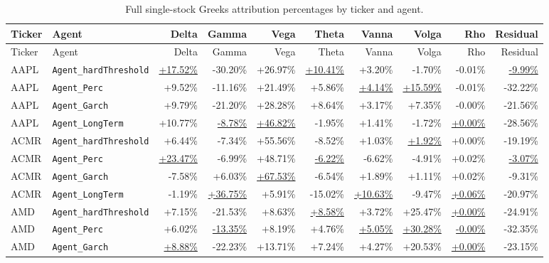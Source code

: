 ﻿\documentclass{article}
\begin{document}
\begingroup
\scriptsize
\setlength{\tabcolsep}{4pt}
\begin{longtable}{llrrrrrrrr}
\caption{Full single-stock Greeks attribution percentages by ticker and agent.}\label{tab:stock-greeks-full} \\
\toprule
Ticker & Agent & Delta & Gamma & Vega & Theta & Vanna & Volga & Rho & Residual \\
\midrule
\endfirsthead

\toprule
Ticker & Agent & Delta & Gamma & Vega & Theta & Vanna & Volga & Rho & Residual \\
\midrule
\endhead

AAPL & \texttt{Agent\_hardThreshold} & \underline{+17.52\%} & -30.20\% & +26.97\% & \underline{+10.41\%} & +3.20\% & -1.70\% & -0.01\% & \underline{-9.99\%} \\
AAPL & \texttt{Agent\_Perc}          & +9.52\%  & -11.16\% & +21.49\% & +5.86\%  & \underline{+4.14\%} & \underline{+15.59\%} & -0.01\% & -32.22\% \\
AAPL & \texttt{Agent\_Garch}         & +9.79\%  & -21.20\% & +28.28\% & +8.64\%  & +3.17\% & +7.35\%  & -0.00\% & -21.56\% \\
AAPL & \texttt{Agent\_LongTerm}      & +10.77\% & \underline{-8.78\%}  & \underline{+46.82\%} & -1.95\%  & +1.41\% & -1.72\%  & \underline{+0.00\%} & -28.56\% \\
\midrule
ACMR & \texttt{Agent\_hardThreshold} & +6.44\%  & -7.34\%  & +55.56\% & -8.52\%  & +1.03\% & \underline{+1.92\%}  & +0.00\% & -19.19\% \\
ACMR & \texttt{Agent\_Perc}          & \underline{+23.47\%} & -6.99\%  & +48.71\% & \underline{-6.22\%}  & -6.62\% & -4.91\%  & +0.02\% & \underline{-3.07\%} \\
ACMR & \texttt{Agent\_Garch}         & -7.58\%  & +6.03\%  & \underline{+67.53\%} & -6.54\%  & +1.89\% & +1.11\%  & +0.02\% & -9.31\% \\
ACMR & \texttt{Agent\_LongTerm}      & -1.19\%  & \underline{+36.75\%} & +5.91\%  & -15.02\% & \underline{+10.63\%} & -9.47\% & \underline{+0.06\%} & -20.97\% \\
\midrule
AMD  & \texttt{Agent\_hardThreshold} & +7.15\%  & -21.53\% & +8.63\%  & \underline{+8.58\%}  & +3.72\% & +25.47\% & \underline{+0.00\%} & -24.91\% \\
AMD  & \texttt{Agent\_Perc}          & +6.02\%  & \underline{-13.35\%} & +8.19\%  & +4.76\%  & \underline{+5.05\%} & \underline{+30.28\%} & \underline{-0.00\%} & -32.35\% \\
AMD  & \texttt{Agent\_Garch}         & \underline{+8.88\%}  & -22.23\% & +13.71\% & +7.24\%  & +4.27\% & +20.53\% & \underline{+0.00\%} & -23.15\% \\

\end{longtable}
\end{document}
